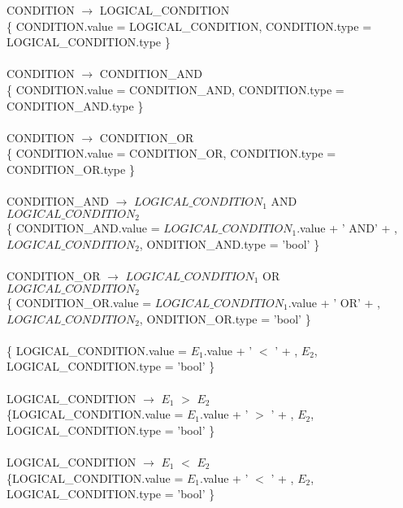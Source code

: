 \documentclass[10pt,a4paper]{article}
\begin{document}
{{{CONDITION $\rightarrow$ LOGICAL\_CONDITION   \\
\{ CONDITION.value = LOGICAL\_CONDITION,  CONDITION.type = LOGICAL\_CONDITION.type \}  \\ \\


CONDITION $\rightarrow$ CONDITION\_AND   \\

\{ CONDITION.value = CONDITION\_AND,  CONDITION.type = CONDITION\_AND.type \}  \\ \\

CONDITION $\rightarrow$ CONDITION\_OR \\

\{ CONDITION.value = CONDITION\_OR,  CONDITION.type = CONDITION\_OR.type \}  \\ \\


CONDITION\_AND $\rightarrow$ $LOGICAL\_CONDITION_{1}$ AND $LOGICAL\_CONDITION_{2}$ \\

\{ CONDITION\_AND.value = $LOGICAL\_CONDITION_{1}$.value + ' AND' +  , $LOGICAL\_CONDITION_{2}$,  ONDITION\_AND.type = 'bool' \}  \\ \\


CONDITION\_OR $\rightarrow$ $LOGICAL\_CONDITION_{1}$ OR $LOGICAL\_CONDITION_{2}$ \\


\{ CONDITION\_OR.value = $LOGICAL\_CONDITION_{1}$.value + ' OR' +  , $LOGICAL\_CONDITION_{2}$,  ONDITION\_OR.type = 'bool' \}  \\ \\


\{ LOGICAL\_CONDITION.value = $E_{1}$.value + ' $<$ ' +  , $E_{2}$,  LOGICAL\_CONDITION.type = 'bool' \}  \\ \\


LOGICAL\_CONDITION $\rightarrow$ $E_{1}$ $>$ $E_{2}$   \\

\{LOGICAL\_CONDITION.value = $E_{1}$.value + ' $>$ ' +  , $E_{2}$,  LOGICAL\_CONDITION.type = 'bool' \}  \\ \\

LOGICAL\_CONDITION $\rightarrow$ $E_{1}$ $<$ $E_{2}$   \\

\{LOGICAL\_CONDITION.value = $E_{1}$.value + ' $<$ ' +  , $E_{2}$,  LOGICAL\_CONDITION.type = 'bool' \}  \\ \\


}}}
\end{document}
